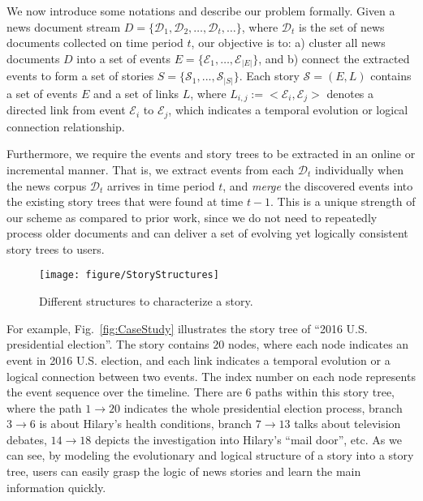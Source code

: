We now introduce some notations and describe our problem formally. Given a news document stream $D = \{ \mathcal{D}_1, \mathcal{D}_2, \ldots, \mathcal{D}_t,\ldots \}$, where $\mathcal{D}_t$ is the set of news documents collected on time period $t$, our objective is to: a) cluster all news documents $D$ into a set of events $E = \{ \mathcal{E}_1, \ldots, \mathcal{E}_{|E|} \}$, and b) connect the extracted events to form a set of stories $S = \{ \mathcal{S}_1, ..., \mathcal{S}_{|S|} \}$. Each story $\mathcal{S} = (E, L)$ contains a set of events $E$ and a set of links $L$, where $L_{i,j} := <\mathcal{E}_i, \mathcal{E}_j>$ denotes a directed link from event $\mathcal{E}_i$ to $\mathcal{E}_j$, which indicates a temporal evolution or logical connection relationship.

Furthermore, we require the events and story trees to be extracted in an online or incremental manner. That is, we extract events from each $\mathcal D_t$ individually when the news corpus $\mathcal D_t$ arrives in time period $t$, and \emph{merge} the discovered events into the existing story trees that were found at time $t-1$. This is a unique strength of our scheme as compared to prior work, since we do not need to repeatedly process older documents and can deliver  a set of evolving yet logically consistent story trees to users.  


\begin{figure}
\texttt{[image: figure/StoryStructures]}
\caption{Different structures to characterize a story.}
\vspace{-2mm}
\label{fig:storyStructures}
\vspace{-2mm}
\end{figure}

For example, Fig.~\ref{fig:CaseStudy} illustrates the story tree of ``2016 U.S. presidential election''. The story contains $20$ nodes, where each node indicates an event in 2016 U.S. election, and each link indicates a temporal evolution or a logical connection between two events. %
The index number on each node represents the event sequence over the timeline. There are $6$ paths within this story tree, where the path $1 \rightarrow 20$ indicates the whole presidential election process, branch $3 \rightarrow 6$ is about Hilary's health conditions, branch $7 \rightarrow 13$ talks about television debates, $14 \rightarrow 18$ depicts the investigation into Hilary's ``mail door'', etc. As we can see, by modeling the evolutionary and logical structure of a story into a story tree, users can easily grasp the logic of news stories and learn the main information quickly. 


